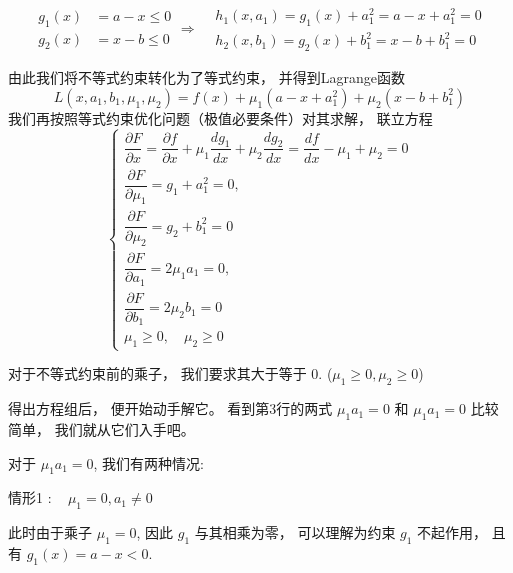 \begin{equation}\begin{aligned}
    g_1(x) &= a - x \le 0 \\
    g_2(x) &= x - b \le 0
\end{aligned} \Rightarrow \begin{aligned}
    &h_{1}\left(x, a_{1}\right)=g_{1}(x)+a_{1}^{2}=a-x+a_{1}^{2}=0\\
    &h_{2}\left(x, b_{1}\right)=g_{2}(x)+b_{1}^{2}=x-b+b_{1}^{2}=0
\end{aligned}\end{equation}


由此我们将不等式约束转化为了等式约束， 并得到Lagrange函数
\begin{equation}
L\left(x, a_{1}, b_{1}, \mu_{1}, \mu_{2}\right)=f(x)+\mu_{1}\left(a-x+a_{1}^{2}\right)+\mu_{2}\left(x-b+b_{1}^{2}\right)
\end{equation}
我们再按照等式约束优化问题（极值必要条件）对其求解， 联立方程
\begin{equation}
\left\{\begin{array}{l}
\dfrac{\partial F}{\partial x}=\dfrac{\partial f}{\partial x}+\mu_{1} \dfrac{d g_{1}}{d x}+\mu_{2} \dfrac{d g_{2}}{d x}=\dfrac{d f}{d x}-\mu_{1}+\mu_{2}=0 \\
\dfrac{\partial F}{\partial \mu_{1}}=g_{1}+a_{1}^{2}=0, \\ 
\dfrac{\partial F}{\partial \mu_{2}}=g_{2}+b_{1}^{2}=0 \\
\dfrac{\partial F}{\partial a_{1}}=2 \mu_{1} a_{1}=0, \\ 
\dfrac{\partial F}{\partial b_{1}}=2 \mu_{2} b_{1}=0 \\
\mu_{1} \geq 0, \quad \mu_{2} \geq 0
\end{array}\right.
\end{equation}

\begin{remark}
    对于不等式约束前的乘子， 我们要求其大于等于 0. ($\mu_{1} \geq 0, \mu_{2} \geq 0$)
\end{remark}

得出方程组后， 便开始动手解它。 看到第3行的两式 $\mu_{1} a_{1}=0$ 和 $\mu_{1} a_{1}=0$ 比较简单， 我们就从它们入手吧。

对于 $\mu_{1} a_{1}=0$, 我们有两种情况:

情形1 $: \quad \mu_{1}=0, a_{1} \neq 0$

此时由于乘子 $\mu_{1}=0$, 因此 $g_{1}$ 与其相乘为零， 可以理解为约束 $g_{1}$ 不起作用， 且有 $g_{1}(x)=a-x<0 .$

